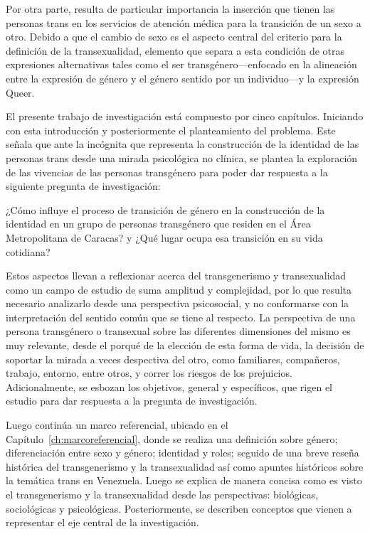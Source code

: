 Por otra parte, resulta de particular importancia la inserción que tienen las
personas trans en los servicios de atención médica para la transición de un sexo
a otro.
Debido a que el cambio de sexo es el aspecto central del criterio para la
definición de la transexualidad, elemento que separa a esta condición de otras
expresiones alternativas tales como el ser transgénero—enfocado en la
alineación entre la expresión de género y el género sentido por un individuo—y
la expresión Queer.

El presente trabajo de investigación está compuesto por cinco capítulos.
Iniciando con esta introducción y posteriormente el planteamiento del problema.
Este señala que ante la incógnita que representa la construcción de la identidad
de las personas trans desde una mirada psicológica no clínica, se plantea la
exploración de las vivencias de las personas transgénero para poder dar respuesta a la
siguiente pregunta de investigación:

\begin{slshape}
  \begin{adjustwidth}{2em}{2em}\label{preguntas}
¿Cómo influye el proceso de transición de género en la construcción de la
identidad en un grupo de personas transgénero que residen en el Área
Metropolitana de Caracas? y ¿Qué lugar ocupa esa transición en su vida cotidiana?
  \end{adjustwidth}
\end{slshape}

Estos aspectos llevan a reflexionar acerca del transgenerismo y transexualidad
como un campo de estudio de suma amplitud y complejidad, por lo que resulta
necesario analizarlo desde una perspectiva psicosocial, y no conformarse con la
interpretación del sentido común que se tiene al respecto. La perspectiva de una
persona transgénero o transexual sobre las diferentes dimensiones del mismo es
muy relevante, desde el porqué de la elección de esta forma de vida, la decisión
de soportar la mirada a veces despectiva del otro, como familiares, compañeros,
trabajo, entorno, entre otros, y correr los riesgos de los prejuicios.
Adicionalmente, se esbozan los objetivos, general y específicos, que rigen el
estudio para dar respuesta a la pregunta de investigación.

Luego continúa un marco referencial, ubicado en el
Capítulo~\ref{ch:marcoreferencial}, donde se realiza una definición
sobre género;
diferenciación entre sexo y género;
identidad y roles;
seguido de una breve reseña histórica del transgenerismo y la transexualidad así como
apuntes históricos sobre la temática trans en Venezuela.
Luego se explica de manera concisa como es visto el transgenerismo y la
transexualidad desde las perspectivas: biológicas, sociológicas y
psicológicas.
Posteriormente, se describen conceptos que vienen a representar el eje central
de la investigación.

